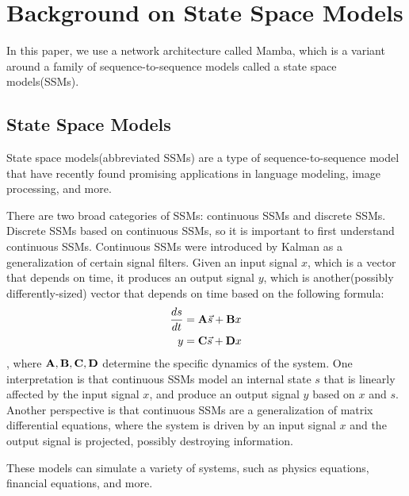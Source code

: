 
\section{Background on State Space Models}
\label{section:background}
In this paper, we use a network architecture called Mamba, which is a variant
around a family of sequence-to-sequence models called a state space
models(SSMs).

\subsection{State Space Models}
State space models(abbreviated SSMs) are a type of sequence-to-sequence model
that have recently found promising applications in language
modeling\cite{mamba}, image processing\cite{medmamba}, and more\cite{s4}.

There are two broad categories of SSMs: continuous SSMs and discrete SSMs.
Discrete SSMs based on continuous SSMs, so it is important to first understand
continuous SSMs.
Continuous SSMs were introduced by Kalman\cite{kalman} as a generalization of
certain signal filters.
Given an input signal $x$, which is a vector that depends on time, it produces
an output signal $y$, which is another(possibly differently-sized) vector that
depends on time based on the following formula:
$$\begin{aligned}
    \frac{ds}{dt} &= {\mathbf{A}}\vec{s} + {\mathbf{B}} x \\
    y &= {\mathbf{C}}\vec{s} + {\mathbf{D}} x
\end{aligned}$$
, where ${\mathbf{A}}, {\mathbf{B}}, {\mathbf{C}}, {\mathbf{D}}$ determine the specific dynamics of the system.
One interpretation is that continuous SSMs model an internal state $s$ that is
linearly affected by the input signal $x$, and produce an output signal $y$
based on $x$ and $s$.
Another perspective is that continuous SSMs are a generalization of matrix
differential equations, where the system is driven by an input signal $x$ and
the output signal is projected, possibly destroying information.

These models can simulate a variety of systems, such as physics equations,
financial equations, and more.

